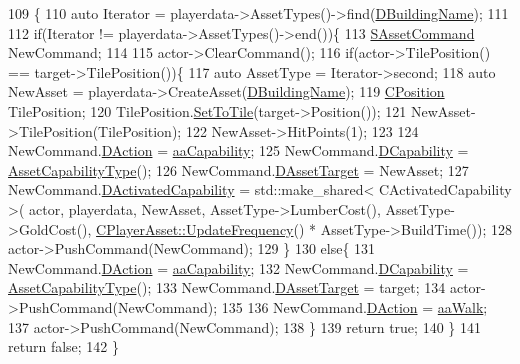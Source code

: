 \begin{DoxyCode}
109                                                                                                            
                                                               \{
110     \textcolor{keyword}{auto} Iterator = playerdata->AssetTypes()->find(\hyperlink{classCPlayerCapabilityBuildNormal_aae09d6cee5f8e201a0139c9065a5577c}{DBuildingName});
111     
112     \textcolor{keywordflow}{if}(Iterator != playerdata->AssetTypes()->end())\{
113         \hyperlink{structSAssetCommand}{SAssetCommand} NewCommand;
114         
115         actor->ClearCommand();
116         \textcolor{keywordflow}{if}(actor->TilePosition() == target->TilePosition())\{
117             \textcolor{keyword}{auto} AssetType = Iterator->second;
118             \textcolor{keyword}{auto} NewAsset = playerdata->CreateAsset(\hyperlink{classCPlayerCapabilityBuildNormal_aae09d6cee5f8e201a0139c9065a5577c}{DBuildingName});
119             \hyperlink{classCPosition}{CPosition} TilePosition;
120             TilePosition.\hyperlink{classCPosition_ae302aa21792de64c97de29e2cbbfeb94}{SetToTile}(target->Position());
121             NewAsset->TilePosition(TilePosition);
122             NewAsset->HitPoints(1);
123 
124             NewCommand.\hyperlink{structSAssetCommand_a8edd3b3d59a76d5514ba403bc8076a75}{DAction} = \hyperlink{GameDataTypes_8h_ab47668e651a3032cfb9c40ea2d60d670acf9fb164e8abd71c71f4a8c7fda360d4}{aaCapability};
125             NewCommand.\hyperlink{structSAssetCommand_a734ea7c6847457b437360f333f570ff9}{DCapability} = \hyperlink{classCPlayerCapability_a433bb196cd6ab6a932f1cac102b3aa98}{AssetCapabilityType}();
126             NewCommand.\hyperlink{structSAssetCommand_a3d9b43f6e59c386c48c41a65448a0c39}{DAssetTarget} = NewAsset;
127             NewCommand.\hyperlink{structSAssetCommand_ad8beda19520811cc70fe1eab16c774dd}{DActivatedCapability} = std::make\_shared< CActivatedCapability >(
      actor, playerdata, NewAsset, AssetType->LumberCost(), AssetType->GoldCost(), 
      \hyperlink{classCPlayerAsset_a0aff85b9552967a42f4f3f42cb59c19f}{CPlayerAsset::UpdateFrequency}() * AssetType->BuildTime());
128             actor->PushCommand(NewCommand);
129         \}
130         \textcolor{keywordflow}{else}\{
131             NewCommand.\hyperlink{structSAssetCommand_a8edd3b3d59a76d5514ba403bc8076a75}{DAction} = \hyperlink{GameDataTypes_8h_ab47668e651a3032cfb9c40ea2d60d670acf9fb164e8abd71c71f4a8c7fda360d4}{aaCapability};
132             NewCommand.\hyperlink{structSAssetCommand_a734ea7c6847457b437360f333f570ff9}{DCapability} = \hyperlink{classCPlayerCapability_a433bb196cd6ab6a932f1cac102b3aa98}{AssetCapabilityType}();
133             NewCommand.\hyperlink{structSAssetCommand_a3d9b43f6e59c386c48c41a65448a0c39}{DAssetTarget} = target;
134             actor->PushCommand(NewCommand);
135             
136             NewCommand.\hyperlink{structSAssetCommand_a8edd3b3d59a76d5514ba403bc8076a75}{DAction} = \hyperlink{GameDataTypes_8h_ab47668e651a3032cfb9c40ea2d60d670a60ca9010aa62b73c1aab838ff4bf7276}{aaWalk};
137             actor->PushCommand(NewCommand);
138         \}
139         \textcolor{keywordflow}{return} \textcolor{keyword}{true};
140     \}
141     \textcolor{keywordflow}{return} \textcolor{keyword}{false};
142 \}
\end{DoxyCode}
